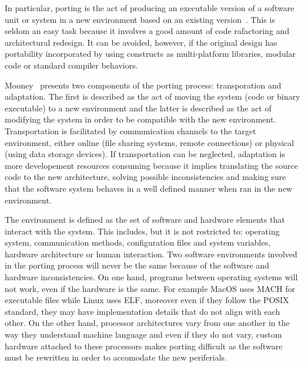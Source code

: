 \documentclass[12pt,a4paper]{report}
\begin{document}
In particular, porting is the act of producing an executable version of a software unit or system in a new
environment based on an existing version~\cite{mooney1993issues}. This is seldom an easy task
because it involves a good amount of code rafactoring and architectural redesign. It can be
avoided, however, if the original design has portability incorporated by using constructs as
multi-platform libraries, modular code or standard compiler behaviors.

Mooney~\cite{mooney1993issues} presents two components of the porting process: transporation and
adaptation. The first is described as the act of moving the system (code or binary executable) to a
new environment and the latter is described as the act of modifying the system in order to be
compatible with the new environment. Transportation is facilitated by communication channels
to the target environment, either online (file sharing systems, remote connections) or physical
(using data storage devices). If transportation can be neglected, adaptation is more developement
resources consuming because it implies translating the source code to the new architecture, solving
possible inconsistencies and making sure that the software system behaves in a well defined manner
when ran in the new environment.

The environment is defined as the
set of software and hardware elements that interact with the system. This includes, but it is not
restricted to: operating system, communication methods, configuration files and system variables,
hardware architecture or human interaction. Two software environments involved in the porting
process will never be the same because of the software and hardware inconsistencies. On one hand,
programs between operating systems will not work, even if the hardware is the same. For example MacOS
uses MACH for executable files while Linux uses ELF, moreover even if they follow the POSIX
standard, they may have implementation details that do not align with each other. On the other
hand, processor architectures vary from one another in the way they understand machine language
and even if they do not vary, custom hardware attached to these processors makes porting difficult as
the software must be rewritten in order to accomodate the new periferials.
\end{document}
